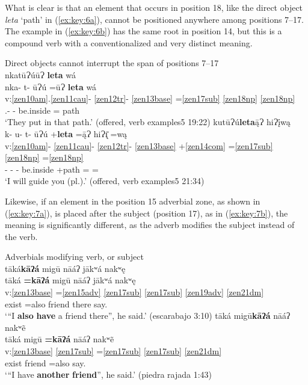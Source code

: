\documentclass[output=paper]{langscibook}
\begin{document}
What is clear is that an element that occurs in position 18, like the direct object \textit{leta} `path' in (\ref{ex:key:6a}), cannot be positioned anywhere among positions 7{}--17. The example in (\ref{ex:key:6b}) has the same root in position 14, but this is a compound verb with a conventionalized and very distinct meaning.


\ea\label{bkm:Ref90309480}Direct objects cannot interrupt the span of positions 7{}--17\\
            \ea\label{ex:key:6a} {nkatūɁúūɁ \textbf{leta} wá\\
            \glll  nka- t- ūɁú =ūɁ \textbf{leta} wá\\ 
            v:\ref{zen10am}.\ref{zen11cau}{}- \ref{zen12tr}{}- \ref{zen13base} =\ref{zen17sub} \ref{zen18np} \ref{zen18np} \\ 
            \Pfv{}.\Caus{}- \Trvz{}- be.inside =\Third\Pl{} path \Dist{}\\
            \glt `They put in that path.' (offered, verb examples5 19:22) 
            }
            \ex \label{ex:key:6b}{
            kutūɁú\textbf{leta}ą̄Ɂ hiɁį̄wą\\
            \glll k- u- t- ūɁú +\textbf{leta} =ą̄Ɂ hiɁ\={\k{ı}} =wą\\
            v:\ref{zen10am}{}- \ref{zen11cau}{}- \ref{zen12tr}{}- \ref{zen13base} +\ref{zen14com} =\ref{zen17sub} \ref{zen18np} =\ref{zen18np} \\
            \Pot{}- \Caus{}- \Trvz{}- be.inside +path =\First\Sg{} \Obj{} =\Second\Pl{}\\ 
            \glt `I will guide you (pl.).' (offered, verb examples5 21:34)
            }
            \z     
\z

Likewise, if an element in the position 15 adverbial zone, as shown in (\ref{ex:key:7a}), is placed after the subject (position 17), as in (\ref{ex:key:7b}), the meaning is significantly different, as the adverb modifies the subject instead of the verb.


\ea\label{bkm:Ref90312746}Adverbials modifying verb, or subject \\
            \ea\label{ex:key:7a} {
            tāká\textbf{kāʔá} migū nāáʔ jākʷá nakʷę\\ 
            \glll  tāká \textbf{=kāʔá} migū nāáʔ jākʷá nakʷę\\ 
            v:\ref{zen13base} =\ref{zen15adv} \ref{zen17sub} \ref{zen17sub} \ref{zen19adv} \ref{zen21dm} \\ 
            exist =also friend \First\Sg{} there say.\Third{}\\ 
            \glt `“I \textbf{also} \textbf{have} a friend there”, he said.' (escarabajo 3:10)
            }
            \ex \label{ex:key:7b}{
            tāká migū\textbf{kāʔá} nāáʔ nakʷẽ\\ 
            \glll tāká migū \textbf{=kāʔá} nāáʔ nakʷẽ\\ 
            v:\ref{zen13base} \ref{zen17sub}  =\ref{zen17sub} \ref{zen17sub} \ref{zen21dm} \\
            exist friend =also \First\Sg{} say.\Third{}\\
            \glt `“I have \textbf{another} \textbf{friend}”, he said.' (piedra rajada 1:43)
            }
            \z 
\z
\end{document}
